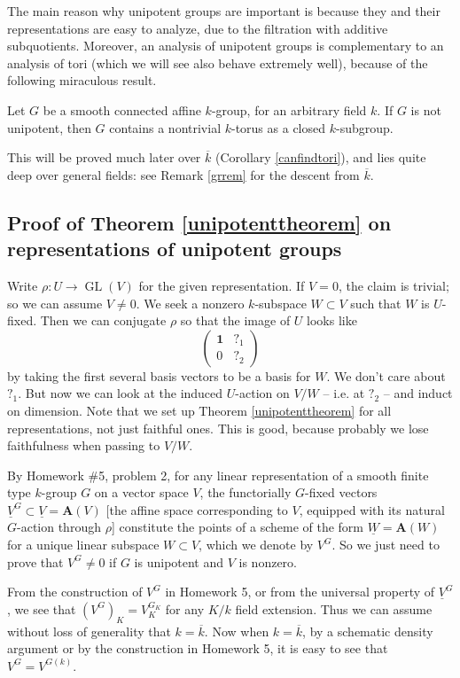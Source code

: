 \documentclass[10pt]{article}
\renewcommand{\AA}{\mathbf{A}}
\newcommand{\GL}{\operatorname{GL}}
\renewcommand{\(}{\left(}
\renewcommand{\)}{\right)}
\renewcommand{\bar}{\overline}
\DeclareMathOperator{\id}{\mathbf{1}}
\numberwithin{thm}{subsection}
\begin{document}
The main reason why unipotent groups are important is because they and their representations are easy to analyze, due to the filtration with additive subquotients. Moreover, an analysis of unipotent groups is complementary to
an analysis of tori (which we will see also behave extremely well), because of the following miraculous result.
\begin{thm}\label{bigmiracle}
Let $G$ be a smooth connected affine $k$-group, for an arbitrary field $k$.
If $G$ is not unipotent, then $G$ contains a nontrivial $k$-torus
as a closed $k$-subgroup.
\end{thm}

This will be proved much later over $\overline{k}$ (Corollary \ref{canfindtori}),
and lies quite deep over general fields: see Remark \ref{grrem} for the descent from $\overline{k}$.

\subsection{Proof of Theorem \ref{unipotenttheorem} on representations of unipotent groups}
Write $\rho:U\to \GL(V)$ for the given representation.  
If $V=0$, the claim is trivial; so we can assume $V \ne 0$. 
We seek a nonzero $k$-subspace $W\subset V$
such that $W$ is $U$-fixed.
Then we can conjugate $\rho$
so that the image of $U$ looks like
\[\(\begin{smallmatrix}\id&?_1\\0&?_2\end{smallmatrix}\)\]
by taking the first several basis vectors to be a basis for $W$.
We don't care about $?_1$. But now we can look at the induced $U$-action
on $V/W$ -- i.e. at $?_2$ -- and induct on dimension.
Note that we set up Theorem \ref{unipotenttheorem} for all representations, not just faithful ones. This is good, because probably we lose faithfulness when passing to $V/W$.

By Homework \#5, problem 2, for any linear representation of a smooth finite type $k$-group $G$ on a vector space $V$,
the functorially $G$-fixed vectors $\underline V^G\subset \underline V = \AA(V)$ [the affine space corresponding to $V$, equipped with its natural $G$-action
through $\rho$] constitute the points of a scheme of the form $\underline W = \AA(W)$ for a unique
linear subspace $W\subset V$, which we denote by $V^G$.
So we just need to prove that $V^G\neq 0$
if $G$ is unipotent and $V$ is nonzero.

From the construction of $V^G$ in Homework 5, or from the universal property of $\underline V^G$, we see
 that $(V^G)_{K}=V_K^{G_K}$ for any $K/k$ field extension. Thus we can assume without loss of generality 
 that $k=\bar k$.
Now when $k=\bar k$, by a schematic density argument or by the construction in Homework 5, it 
is easy to see that $V^G=V^{G(k)}$.
\end{document}
